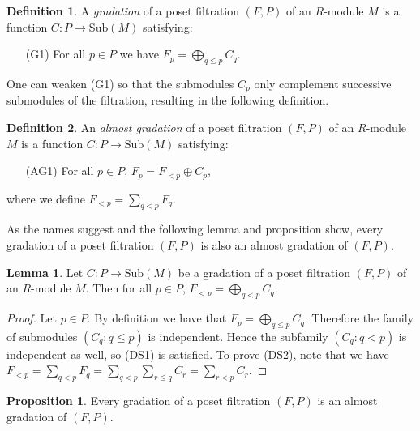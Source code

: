 \documentclass[oneside,11pt]{amsart}
\newcommand{\Sub}{\ensuremath{\text{Sub}}}
\theoremstyle{definition}
\newtheorem{definition}{Definition}
\newtheorem{proof techniques}{Proof Techniques}
\newtheorem{lemma}{Lemma}
\newtheorem{proposition}{Proposition}
\begin{document}
\begin{definition}
A \emph{gradation} of a poset filtration $(F , P)$ of an $R$-module $M$ is a function $C: P \to \Sub(M)$ satisfying: 
\begin{itemize}

\item[(G1)] For all $p \in P$ we have $F_p = \bigoplus_{q \leq p} C_q$. 

\end{itemize}
\end{definition}

One can weaken (G1) so that the submodules $C_p$ only complement successive submodules of the filtration, resulting in the following definition.  

\begin{definition}
An \emph{almost gradation} of a poset filtration $(F , P)$ of an $R$-module $M$ is a function $C: P \to \Sub(M)$ satisfying: 
\begin{itemize}

\item[(AG1)] For all $p \in P$, $F_p = F_{< p} \oplus C_p$,

\end{itemize}
where we define $F_{<p} = \sum_{q < p} F_q$. 
\end{definition}

As the names suggest and the following lemma and proposition show, every gradation of a poset filtration $(F , P)$ is also an almost gradation of $(F , P)$. 

\begin{lemma}\label{lem:less than direct sum gradation}
Let $C: P \to \Sub(M)$ be a gradation of a poset filtration $(F , P)$ of an $R$-module $M$. Then for all $p \in P$, $F_{<p} = \bigoplus_{q < p} C_q$. 
\end{lemma}

\begin{proof}
Let $p \in P$. By definition we have that $F_p = \bigoplus_{q \leq p} C_q$. Therefore the family of submodules $(C_q : q \leq p)$ is independent. Hence the subfamily $(C_q : q < p)$ is independent as well, so (DS1) is satisfied. To prove (DS2), note that we have $F_{< p} = \sum_{q < p} F_q = \sum_{q < p} \sum_{r \leq q} C_r = \sum_{r < p} C_r$. 
\end{proof}

\begin{proposition}\label{prop: gradation implies almost gradation}
Every gradation of a poset filtration $(F , P)$ is an almost gradation of $(F , P)$. 
\end{proposition}
\end{document}
